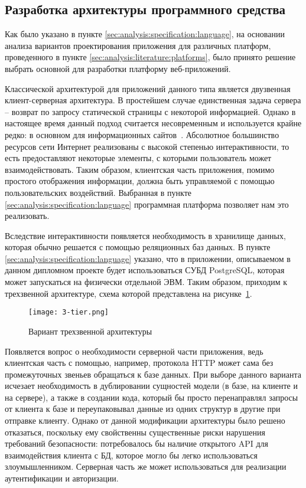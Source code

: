 \subsection{Разработка архитектуры программного средства}
\label{sec:design:architecture}

Как было указано в пункте \ref{sec:analysis:specification:language}, на основании анализа вариантов проектирования
приложения для различных платформ, проведенного в пункте \ref{sec:analysis:literature:platforms}, было принято решение
выбрать основной для разработки платформу веб-приложений.

Классической архитектурой для приложений данного типа является двузвенная клиент-серверная архитектура. В простейшем
случае единственная задача сервера -- возврат по запросу статической страницы с некоторой информацией. Однако в
настоящее время данный подход считается несовременным и используется крайне редко: в основном для
информационных сайтов~\cite{from_sites_to_webapps}. Абсолютное большинство ресурсов сети Интернет реализованы с
высокой степенью интерактивности, то есть предоставляют некоторые элементы, с которыми пользователь может
взаимодействовать. Таким образом, клиентская часть приложения, помимо простого отображения информации, должна
быть управляемой с помощью пользовательских воздействий. Выбранная в пункте \ref{sec:analysis:specification:language}
программная платформа позволяет нам это реализовать.

Вследствие интерактивности появляется необходимость в хранилище данных, которая обычно решается с помощью реляционных
баз данных. В пункте \ref{sec:analysis:specification:language} указано, что в приложении, описываемом в данном
дипломном проекте будет использоваться СУБД PostgreSQL, которая может запускаться на физически отдельной ЭВМ.
Таким образом, приходим к трехзвенной архитектуре, схема которой представлена на
рисунке~\ref{fig:analysis:specification:language:3-tier}.

\begin{figure}[ht]
  \centering
    \texttt{[image: 3-tier.png]}
    \caption{Вариант трехзвенной архитектуры}
    \label{fig:analysis:specification:language:3-tier}
\end{figure}

Появляется вопрос о необходимости серверной части приложения, ведь клиентская часть с помощью, например, протокола
HTTP может сама без промежуточных звеньев обращаться к базе данных. При выборе данного варианта исчезает
необходимость в дублировании сущностей модели (в базе, на клиенте и на сервере), а также в создании кода, который бы
просто перенаправлял запросы от клиента к базе и переупаковывал данные из одних структур в другие при отправке клиенту.
Однако от данной модификации архитектуры было решено отказаться, поскольку ему свойственны существенные риски
нарушения требований безопасности: потребовалось бы наличие открытого API для взаимодействия клиента с БД, которое
могло бы легко использоваться злоумышленником. Серверная часть же может использоваться для реализации аутентификации и
авторизации. 
